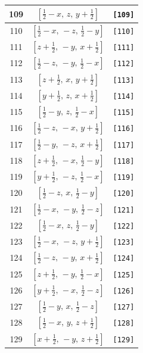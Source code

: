 \documentclass[fleqn,8pt]{jsarticle}
\begin{document}
\begin{longtable}{ccc}
109 & $\left[ \frac{1}{2} - x,\, z,\, y + \frac{1}{2} \right]$ & {\tt [109]} \\ \hline
110 & $\left[ \frac{1}{2} - x,\, - z,\, \frac{1}{2} - y \right]$ & {\tt [110]} \\ \hline
111 & $\left[ z + \frac{1}{2},\, - y,\, x + \frac{1}{2} \right]$ & {\tt [111]} \\ \hline
112 & $\left[ \frac{1}{2} - z,\, - y,\, \frac{1}{2} - x \right]$ & {\tt [112]} \\ \hline
113 & $\left[ z + \frac{1}{2},\, x,\, y + \frac{1}{2} \right]$ & {\tt [113]} \\ \hline
114 & $\left[ y + \frac{1}{2},\, z,\, x + \frac{1}{2} \right]$ & {\tt [114]} \\ \hline
115 & $\left[ \frac{1}{2} - y,\, z,\, \frac{1}{2} - x \right]$ & {\tt [115]} \\ \hline
116 & $\left[ \frac{1}{2} - z,\, - x,\, y + \frac{1}{2} \right]$ & {\tt [116]} \\ \hline
117 & $\left[ \frac{1}{2} - y,\, - z,\, x + \frac{1}{2} \right]$ & {\tt [117]} \\ \hline
118 & $\left[ z + \frac{1}{2},\, - x,\, \frac{1}{2} - y \right]$ & {\tt [118]} \\ \hline
119 & $\left[ y + \frac{1}{2},\, - z,\, \frac{1}{2} - x \right]$ & {\tt [119]} \\ \hline
120 & $\left[ \frac{1}{2} - z,\, x,\, \frac{1}{2} - y \right]$ & {\tt [120]} \\ \hline
121 & $\left[ \frac{1}{2} - x,\, - y,\, \frac{1}{2} - z \right]$ & {\tt [121]} \\ \hline
122 & $\left[ \frac{1}{2} - x,\, z,\, \frac{1}{2} - y \right]$ & {\tt [122]} \\ \hline
123 & $\left[ \frac{1}{2} - x,\, - z,\, y + \frac{1}{2} \right]$ & {\tt [123]} \\ \hline
124 & $\left[ \frac{1}{2} - z,\, - y,\, x + \frac{1}{2} \right]$ & {\tt [124]} \\ \hline
125 & $\left[ z + \frac{1}{2},\, - y,\, \frac{1}{2} - x \right]$ & {\tt [125]} \\ \hline
126 & $\left[ y + \frac{1}{2},\, - x,\, \frac{1}{2} - z \right]$ & {\tt [126]} \\ \hline
127 & $\left[ \frac{1}{2} - y,\, x,\, \frac{1}{2} - z \right]$ & {\tt [127]} \\ \hline
128 & $\left[ \frac{1}{2} - x,\, y,\, z + \frac{1}{2} \right]$ & {\tt [128]} \\ \hline
129 & $\left[ x + \frac{1}{2},\, - y,\, z + \frac{1}{2} \right]$ & {\tt [129]} \\ \hline

\end{longtable}
\end{document}
